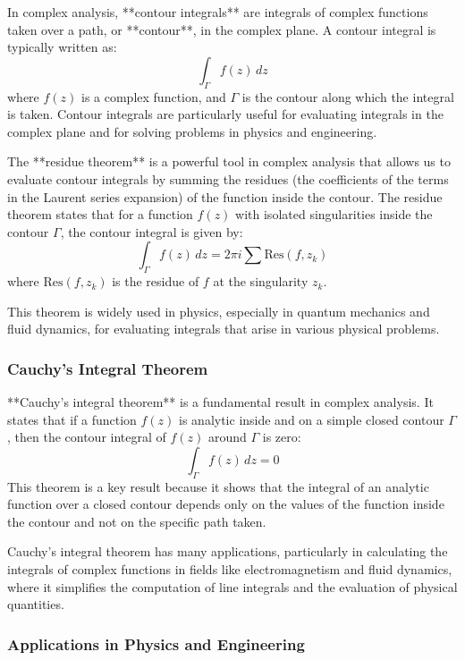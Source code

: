 \documentclass{article}
\begin{document}
In complex analysis, **contour integrals** are integrals of complex functions taken over a path, or **contour**, in the complex plane. A contour integral is typically written as:
\[
\int_{\Gamma} f(z) \, dz
\]
where \( f(z) \) is a complex function, and \( \Gamma \) is the contour along which the integral is taken. Contour integrals are particularly useful for evaluating integrals in the complex plane and for solving problems in physics and engineering.

The **residue theorem** is a powerful tool in complex analysis that allows us to evaluate contour integrals by summing the residues (the coefficients of the terms in the Laurent series expansion) of the function inside the contour. The residue theorem states that for a function \( f(z) \) with isolated singularities inside the contour \( \Gamma \), the contour integral is given by:
\[
\int_{\Gamma} f(z) \, dz = 2\pi i \sum \text{Res}(f, z_k)
\]
where \( \text{Res}(f, z_k) \) is the residue of \( f \) at the singularity \( z_k \).

This theorem is widely used in physics, especially in quantum mechanics and fluid dynamics, for evaluating integrals that arise in various physical problems.

\subsubsection*{Cauchy's Integral Theorem}

**Cauchy’s integral theorem** is a fundamental result in complex analysis. It states that if a function \( f(z) \) is analytic inside and on a simple closed contour \( \Gamma \), then the contour integral of \( f(z) \) around \( \Gamma \) is zero:
\[
\int_{\Gamma} f(z) \, dz = 0
\]
This theorem is a key result because it shows that the integral of an analytic function over a closed contour depends only on the values of the function inside the contour and not on the specific path taken.

Cauchy's integral theorem has many applications, particularly in calculating the integrals of complex functions in fields like electromagnetism and fluid dynamics, where it simplifies the computation of line integrals and the evaluation of physical quantities.

\subsubsection*{Applications in Physics and Engineering}
\end{document}
